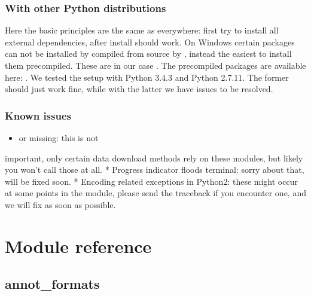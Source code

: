 \documentclass[letterpaper,10pt,english]{sphinxmanual}
\begin{document}
\subsection{With other Python distributions}
\label{\detokenize{installation:with-other-python-distributions}}
Here the basic principles are the same as everywhere: first try to install all
external dependencies, after  install should work. On Windows certain
packages can not be installed by compiled from source by , instead the
easiest to install them precompiled. These are in our case . The
precompiled packages are available here:
. We tested the setup with Python
3.4.3 and Python 2.7.11. The former should just work fine, while with the
latter we have issues to be resolved.


\subsection{Known issues}
\label{\detokenize{installation:known-issues}}\begin{itemize}
\item {} 
 \textendash{} or  missing: this is not

\end{itemize}

important, only certain data download methods rely on these modules, but
likely you won’t call those at all.
* Progress indicator floods terminal: sorry about that, will be fixed soon.
* Encoding related exceptions in Python2: these might occur at some points in
the module, please send the traceback if you encounter one, and we will fix
as soon as possible.



\chapter{Module reference}
\label{\detokenize{reference:module-reference}}\label{\detokenize{reference::doc}}

\section{annot\_formats}
\label{\detokenize{reference:module-pypath.annot_formats}}\label{\detokenize{reference:annot-formats}}
\end{document}
